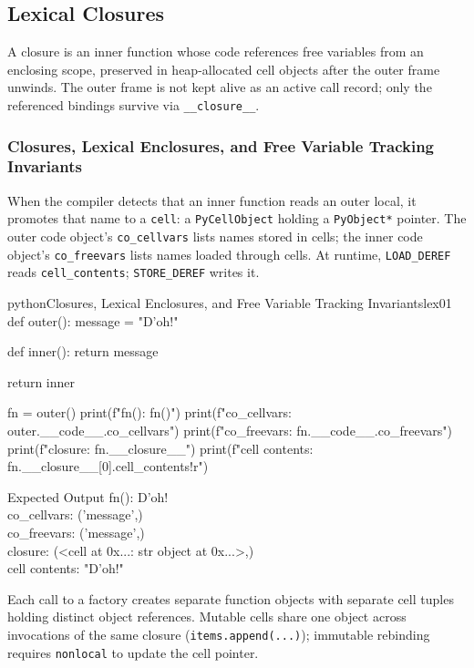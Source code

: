 \documentclass[a4paper,twoside]{report}
\begin{document}
\subsection{Lexical Closures}

A closure is an inner function whose code references free variables from an enclosing scope, preserved in heap-allocated cell objects after the outer frame unwinds. The outer frame is not kept alive as an active call record; only the referenced bindings survive via \texttt{\_\_closure\_\_}.

\subsubsection{Closures, Lexical Enclosures, and Free Variable Tracking Invariants}

When the compiler detects that an inner function reads an outer local, it promotes that name to a \texttt{cell}: a \texttt{PyCellObject} holding a \texttt{PyObject*} pointer. The outer code object's \texttt{co\_cellvars} lists names stored in cells; the inner code object's \texttt{co\_freevars} lists names loaded through cells. At runtime, \texttt{LOAD\_DEREF} reads \texttt{cell\_contents}; \texttt{STORE\_DEREF} writes it.

\begin{codebox}[]{python}{Closures, Lexical Enclosures, and Free Variable Tracking Invariants}{lex01}
def outer():
    message = "D'oh!"

    def inner():
        return message

    return inner

fn = outer()
print(f"fn(): {fn()}")
print(f"co_cellvars: {outer.__code__.co_cellvars}")
print(f"co_freevars: {fn.__code__.co_freevars}")
print(f"closure: {fn.__closure__}")
print(f"cell contents: {fn.__closure__[0].cell_contents!r}")
\end{codebox}


\begin{iobox}{Expected Output}
fn(): D'oh! \\
co\_cellvars: ('message',) \\
co\_freevars: ('message',) \\
closure: (<cell at 0x...: str object at 0x...>,) \\
cell contents: "D'oh!" \\
\end{iobox}




Each call to a factory creates separate function objects with separate cell tuples holding distinct object references. Mutable cells share one object across invocations of the same closure (\texttt{items.append(...)}); immutable rebinding requires \texttt{nonlocal} to update the cell pointer.
\end{document}
